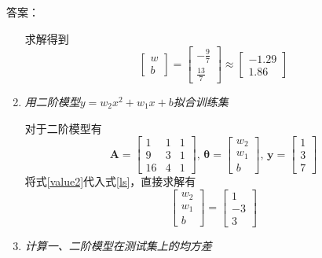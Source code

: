 \documentclass[11pt]{article}
\newenvironment{solution}[1][10cm]{答案：}{}
\newenvironment{solution}[1][10cm]{答案：\vspace{#1}\hide}
    {\endhide}
\newcommand{\mat}[1]{\bm{#1}}
\renewcommand{\vec}[1]{\bm{#1}}
\newcommand{\MA}{\mat{A}}
\newcommand{\Vy}{\vec{y}}
\newcommand{\Vt}{\vec{\theta}}
\begin{document}
\begin{solution}
\begin{enumerate}[label=(\alph*)]
        求解得到
        \begin{equation}
            \begin{bmatrix}
                w\\
                b
            \end{bmatrix}
            =\begin{bmatrix}
                -\frac{9}{7}\\
                \frac{13}{7}
            \end{bmatrix}
            \approx
            \begin{bmatrix}
                -1.29\\
                1.86
            \end{bmatrix}
        \end{equation}
        \item \emph{用二阶模型$y=w_2x^2+w_1x+b$拟合训练集}
        
        对于二阶模型有
        \begin{equation}
            \label{value2}
            \MA=\left[\begin{array}{rrr}
                1 & 1 & 1 \\
                9 & 3 & 1 \\
                16 & 4 & 1
                \end{array}\right],\,
            \Vt=
            \begin{bmatrix}
            w_2\\
            w_1\\
            b
            \end{bmatrix},\,
            \Vy = \begin{bmatrix}
                1\\
                3\\
                7
            \end{bmatrix}
        \end{equation}
        将式\ref{value2}代入式\ref{ls}，直接求解有
        \begin{equation}
            \begin{bmatrix}
            w_2\\
            w_1\\
            b
            \end{bmatrix}=
            \begin{bmatrix}
                1\\
                -3\\
                3
            \end{bmatrix}
        \end{equation}
        \item \emph{计算一、二阶模型在测试集上的\emph{均方差}}
        

\end{enumerate}
\end{solution}
\end{document}
